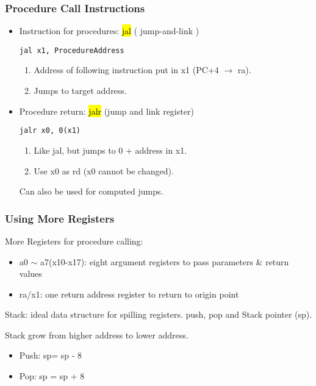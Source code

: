 \subsubsection{Procedure Call Instructions}
\begin{itemize}
    \item Instruction for procedures: \hl{jal} ( jump-and-link )
    \begin{lstlisting}[language={[x86masm]Assembler}, title={Caller}]
jal x1, ProcedureAddress
    \end{lstlisting}
    \begin{enumerate}
        \item Address of following instruction put in x1 (PC+4 $\rightarrow$ ra).
        \item Jumps to target address. 
    \end{enumerate}
    
    \item Procedure return: \hl{jalr} (jump and link register)
    \begin{lstlisting}[language={[x86masm]Assembler}, title={Callee }]
jalr x0, 0(x1)
    \end{lstlisting}
    \begin{enumerate}
        \item Like jal, but jumps to 0 + address in x1.
        \item Use x0 as rd (x0 cannot be changed). 
    \end{enumerate}
    Can also be used for computed jumps. 
     
\end{itemize}

\subsubsection{Using More Registers}
More Registers for procedure calling: 
\begin{itemize}
    \item\small a0 $\sim$ a7(x10-x17): eight argument registers to pass parameters \& return values
    \item\small ra/x1: one return address register to return to origin point
\end{itemize}

Stack: ideal data structure for spilling registers. push, pop and Stack pointer (sp). 

Stack grow from higher address to lower address. 
\begin{itemize}
    \item\small Push: sp= sp - 8
    \item\small Pop: sp = sp + 8
\end{itemize}

